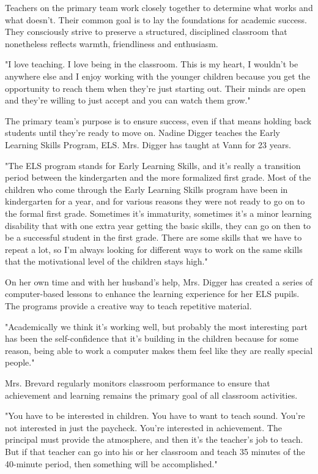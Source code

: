 Teachers on the primary team work closely together to determine what works and what doesn't. Their common goal is to lay the foundations for academic success. They consciously strive to preserve a structured, disciplined classroom that nonetheless reflects warmth, friendliness and enthusiasm.

"I love teaching. I love being in the classroom. This is my heart, I wouldn't be anywhere else and I enjoy working with the younger children because you get the opportunity to reach them when they're just starting out. Their minds are open and they're willing to just accept and you can watch them grow."

The primary team's purpose is to ensure success, even if that means holding back students until they're ready to move on. Nadine Digger teaches the Early Learning Skills Program, ELS. Mrs. Digger has taught at Vann for 23 years.

"The ELS program stands for Early Learning Skills, and it's really a transition period between the kindergarten and the more formalized first grade. Most of the children who come through the Early Learning Skills program have been in kindergarten for a year, and for various reasons they were not ready to go on to the formal first grade. Sometimes it's immaturity, sometimes it's a minor learning disability that with one extra year getting the basic skills, they can go on then to be a successful student in the first grade. There are some skills that we have to repeat a lot, so I'm always looking for different ways to work on the same skills that the motivational level of the children stays high."

On her own time and with her husband's help, Mrs. Digger has created a series of computer-based lessons to enhance the learning experience for her ELS pupils. The programs provide a creative way to teach repetitive material.

"Academically we think it's working well, but probably the most interesting part has been the self-confidence that it's building in the children because for some reason, being able to work a computer makes them feel like they are really special people."

Mrs. Brevard regularly monitors classroom performance to ensure that achievement and learning remains the primary goal of all classroom activities.

"You have to be interested in children. You have to want to teach sound. You're not interested in just the paycheck. You're interested in achievement. The principal must provide the atmosphere, and then it's the teacher's job to teach. But if that teacher can go into his or her classroom and teach 35 minutes of the 40-minute period, then something will be accomplished."

